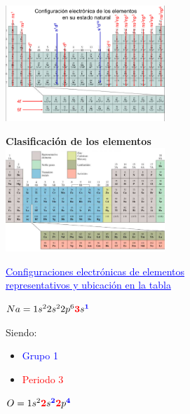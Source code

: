         \saltoPag%
        \begin{center} \includegraphics[width=6cm]{./imagenes/configuracionElectronicaElementosEstadoNatural.png} \end{center}
        \begin{center} \textbf{Clasificación de los elementos} \\[10pt] \includegraphics[width=6cm]{./imagenes/clasificacionELementos.png} \end{center}
        
    \begin{center} \textcolor{blue}{\underline{Configuraciones electrónicas de elementos}} \\ \textcolor{blue}{\underline{representativos y ubicación en la tabla}} \end{center}

        \begin{center} 
            $Na = 1s^2 2s^2 2p^6 \text{\textcolor{red}{\textbf{3}}}s^\text{\textcolor{blue}{\textbf{1}}}$ 
        \end{center}

        Siendo: 
        \begin{itemize}
            \item \textcolor{blue}{Grupo 1}
            \item \textcolor{red}{Periodo 3}
        \end{itemize}
            
        \begin{center} 
            $O = 1s^2 \text{\textcolor{red}{\textbf{2}}}s^\text{\textcolor{blue}{\textbf{2}}} \text{\textcolor{red}{\textbf{2}}}p^\text{\textcolor{blue}{\textbf{4}}}$ 
        \end{center}

